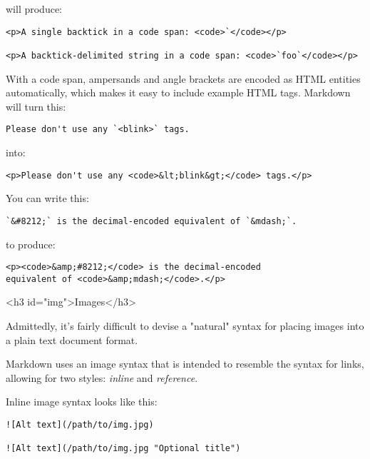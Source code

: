 will produce:

\begin{lstlisting}
<p>A single backtick in a code span: <code>`</code></p>

<p>A backtick-delimited string in a code span: <code>`foo`</code></p>
\end{lstlisting}




With a code span, ampersands and angle brackets are encoded as HTML
entities automatically, which makes it easy to include example HTML
tags. Markdown will turn this:

\begin{lstlisting}
Please don't use any `<blink>` tags.
\end{lstlisting}




into:

\begin{lstlisting}
<p>Please don't use any <code>&lt;blink&gt;</code> tags.</p>
\end{lstlisting}




You can write this:

\begin{lstlisting}
`&#8212;` is the decimal-encoded equivalent of `&mdash;`.
\end{lstlisting}




to produce:

\begin{lstlisting}
<p><code>&amp;#8212;</code> is the decimal-encoded
equivalent of <code>&amp;mdash;</code>.</p>
\end{lstlisting}


<h3 id="img">Images</h3>



Admittedly, it's fairly difficult to devise a "natural" syntax for
placing images into a plain text document format.



Markdown uses an image syntax that is intended to resemble the syntax
for links, allowing for two styles: \emph{inline} and \emph{reference}.



Inline image syntax looks like this:

\begin{lstlisting}
![Alt text](/path/to/img.jpg)

![Alt text](/path/to/img.jpg "Optional title")
\end{lstlisting}




